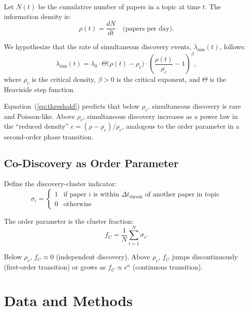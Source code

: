 \documentclass[12pt]{article}
\begin{document}
Let $N(t)$ be the cumulative number of papers in a topic at time $t$. The information density is:
\begin{equation}
  \rho(t) = \frac{dN}{dt} \quad \text{(papers per day)}.
\end{equation}

We hypothesize that the rate of simultaneous discovery events, $\lambda_{\mathrm{sim}}(t)$, follows:
\begin{equation}
  \lambda_{\mathrm{sim}}(t) = \lambda_0 \cdot \Theta\big(\rho(t) - \rho_c\big) \cdot \left(\frac{\rho(t)}{\rho_c} - 1\right)^\beta,
  \label{eq:threshold}
\end{equation}
where $\rho_c$ is the critical density, $\beta > 0$ is the critical exponent, and $\Theta$ is the Heaviside step function.

Equation~(\ref{eq:threshold}) predicts that below $\rho_c$, simultaneous discovery is rare and Poisson-like. Above $\rho_c$, simultaneous discovery increases as a power law in the ``reduced density'' $\epsilon = (\rho - \rho_c)/\rho_c$, analogous to the order parameter in a second-order phase transition.

\subsection{Co-Discovery as Order Parameter}

Define the discovery-cluster indicator:
\begin{equation}
  \sigma_i = \begin{cases}
    1 & \text{if paper } i \text{ is within } \Delta t_{\mathrm{thresh}} \text{ of another paper in topic} \\
    0 & \text{otherwise}
  \end{cases}
\end{equation}

The order parameter is the cluster fraction:
\begin{equation}
  f_C = \frac{1}{N} \sum_{i=1}^N \sigma_i.
  \label{eq:fC}
\end{equation}

Below $\rho_c$, $f_C \approx 0$ (independent discovery). Above $\rho_c$, $f_C$ jumps discontinuously (first-order transition) or grows as $f_C \propto \epsilon^\alpha$ (continuous transition).

\section{Data and Methods}
\end{document}
